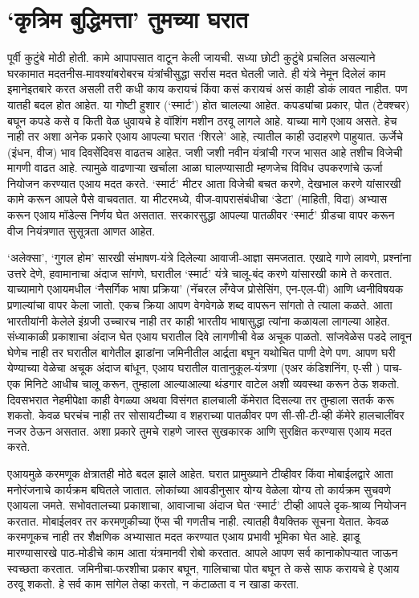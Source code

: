 \chapter{`कृत्रिम बुद्धिमत्ता' तुमच्या घरात}

पूर्वी कुटुंबे मोठी होती. कामे आपापसात वाटून केली जायची. सध्या छोटी कुटुंबे प्रचलित असल्याने घरकामात मदतनीस-मावश्यांबरोबरच यंत्रांचीसुद्धा सर्रास मदत घेतली जाते. ही यंत्रे नेमून दिलेलं काम इमानेइतबारे करत असली तरी कधी काय करायचं किंवा कसं करायचं असं काही डोकं लावत नाहीत. पण यातही बदल होत आहेत. या गोष्टी हुशार (`स्मार्ट') होत चालल्या आहेत. कपड्यांचा प्रकार, पोत (टेक्श्चर) बघून कपडे कसे व किती वेळ धुवायचे हे वॉशिंग मशीन ठरवू लागले आहे. याच्या मागे एआय असते. हेच नाही तर अशा अनेक प्रकारे एआय आपल्या घरात `शिरले' आहे, त्यातील काही उदाहरणे पाहुयात. ऊर्जेचे (इंधन, वीज) भाव दिवसेंदिवस वाढतच आहेत. जशी जशी नवीन यंत्रांची गरज भासत आहे तशीच विजेची मागणी वाढत आहे. त्यामुळे वाढणाऱ्या खर्चाला आळा घालण्यासाठी म्हणजेच विविध उपकरणांचे ऊर्जा नियोजन करण्यात एआय मदत करते. `स्मार्ट' मीटर आता विजेची बचत करणे, देखभाल करणे यांसारखी कामे करून आपले पैसे वाचवतात. या मीटरमध्ये, वीज-वापरासंबंधीचा `डेटा' (माहिती, विदा) अभ्यास करून एआय मॉडेल्स निर्णय घेत असतात. सरकारसुद्धा आपल्या पातळीवर `स्मार्ट' ग्रीडचा वापर करून वीज नियंत्रणात सुसूत्रता आणत आहेत.

`अलेक्सा', `गुगल होम' सारखी संभाषण-यंत्रे दिलेल्या आवाजी-आज्ञा समजतात. एखादे गाणे लावणे, प्रश्नांना उत्तरे देणे, हवामानाचा अंदाज सांगणे, घरातील `स्मार्ट' यंत्रे चालू-बंद करणे यांसारखी कामे ते करतात. याच्यामागे एआयमधील `नैसर्गिक भाषा प्रक्रिया' (नॅचरल लँग्वेज प्रोसेसिंग, एन-एल-पी) आणि ध्वनीविषयक प्रणाल्यांचा वापर केला जातो. एकच क्रिया आपण वेगवेगळे शब्द वापरून सांगतो ते त्याला कळते. आता भारतीयांनी केलेले इंग्रजी उच्चारच नाही तर काही भारतीय भाषासुद्धा त्यांना कळायला लागल्या आहेत. संध्याकाळी प्रकाशाचा अंदाज घेत एआय घरातील दिवे लागणीची वेळ अचूक पाळतो. सांजवेळेस पडदे लावून घेणेच नाही तर घरातील बागेतील झाडांना जमिनीतील आर्द्रता बघून यथोचित पाणी देणे पण. आपण घरी येण्याच्या वेळेचा अचूक अंदाज बांधून, एआय घरातील वातानुकूल-यंत्रणा (एअर कंडिशनिंग, ए-सी ) पाच-एक मिनिटे आधीच चालू करून, तुम्हाला आल्याआल्या थंडगार वाटेल अशी व्यवस्था करून ठेऊ शकतो. दिवसभरात नेहमीपेक्षा काही वेगळ्या अथवा विसंगत हालचाली कॅमेरात दिसल्या तर तुम्हाला सतर्क करू शकतो. केवळ घरचंच नाही तर सोसायटीच्या व शहराच्या पातळीवर पण सी-सी-टी-व्ही कॅमेरे हालचालींवर नजर ठेऊन असतात. अशा प्रकारे तुमचे राहणे जास्त सुखकारक आणि सुरक्षित करण्यास एआय मदत करते.

एआयमुळे करमणूक क्षेत्रातही मोठे बदल झाले आहेत. घरात प्रामुख्याने टीव्हीवर किंवा मोबाईलद्वारे आता मनोरंजनाचे कार्यक्रम बघितले जातात. लोकांच्या आवडीनुसार योग्य वेळेला योग्य तो कार्यक्रम सुचवणे एआयला जमते. सभोवतालच्या प्रकाशाचा, आवाजाचा अंदाज घेत `स्मार्ट' टीव्ही आपले दृक-श्राव्य नियोजन करतात. मोबाईलवर तर करमणुकीच्या ऍप्स ची गणतीच नाही. त्यातही वैयक्तिक सूचना येतात. केवळ करमणूकच नाही तर शैक्षणिक अभ्यासात मदत करण्यात एआय प्रभावी भूमिका घेत आहे. झाडू मारण्यासारखे पाठ-मोडीचे काम आता यंत्रमानवी रोबो करतात. आपले आपण सर्व कानाकोपऱ्यात जाऊन स्वच्छता करतात. जमिनीचा-फरशीचा प्रकार बघून, गालिचाचा पोत बघून ते कसे साफ करायचे हे एआय ठरवू शकतो. हे सर्व काम सांगेल तेव्हा करतो, न कंटाळता व न खाडा करता.

